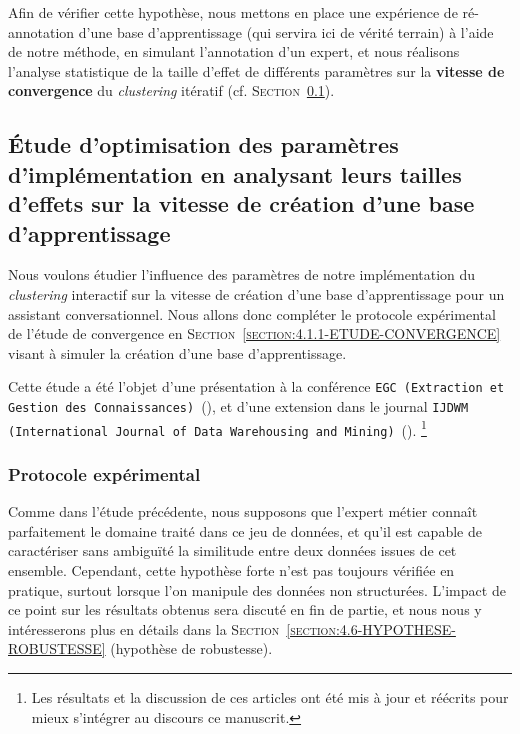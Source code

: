 	Afin de vérifier cette hypothèse, nous mettons en place une expérience de ré-annotation d'une base d'apprentissage (qui servira ici de vérité terrain) à l'aide de notre méthode, en simulant l'annotation d'un expert, et nous réalisons l'analyse statistique de la taille d'effet de différents paramètres sur la \textbf{vitesse de convergence} du \textit{clustering} itératif (cf. \textsc{Section~\ref{section:4.2.1-ETUDE-OPTIMISATION}}).
	
		
	\subsection{Étude d'optimisation des paramètres d’implémentation en analysant leurs tailles d'effets sur la vitesse de création d'une base d'apprentissage}
	\label{section:4.2.1-ETUDE-OPTIMISATION}

		Nous voulons étudier l'influence des paramètres de notre implémentation du \textit{clustering} interactif sur la vitesse de création d'une base d'apprentissage pour un assistant conversationnel.
		Nous allons donc compléter le protocole expérimental de l'étude de convergence en \textsc{Section~\ref{section:4.1.1-ETUDE-CONVERGENCE}} visant à simuler la création d'une base d'apprentissage.
			
		\begin{leftBarInformation}
			Cette étude a été l'objet d'une présentation à la conférence \texttt{EGC (Extraction et Gestion des Connaissances)}~(\cite{schild-etal:2021:conception-iterative-semisupervisee}), et d'une extension dans le journal \texttt{IJDWM (International Journal of Data Warehousing and Mining)}~(\cite{schild-etal:2022:iterative-semisupervised-design}).
			\footnote{Les résultats et la discussion de ces articles ont été mis à jour et réécrits pour mieux s'intégrer au discours ce manuscrit.}
		\end{leftBarInformation}

		\subsubsection{Protocole expérimental}
			
			\begin{leftBarWarning}
				Comme dans l'étude précédente, nous supposons que l'expert métier connaît parfaitement le domaine traité dans ce jeu de données, et qu'il est capable de caractériser sans ambiguïté la similitude entre deux données issues de cet ensemble.
				Cependant, cette hypothèse forte n'est pas toujours vérifiée en pratique, surtout lorsque l'on manipule des données non structurées.
				L'impact de ce point sur les résultats obtenus sera discuté en fin de partie, et nous nous y intéresserons plus en détails dans la \textsc{Section~\ref{section:4.6-HYPOTHESE-ROBUSTESSE}} (hypothèse de robustesse).
			\end{leftBarWarning}
			
